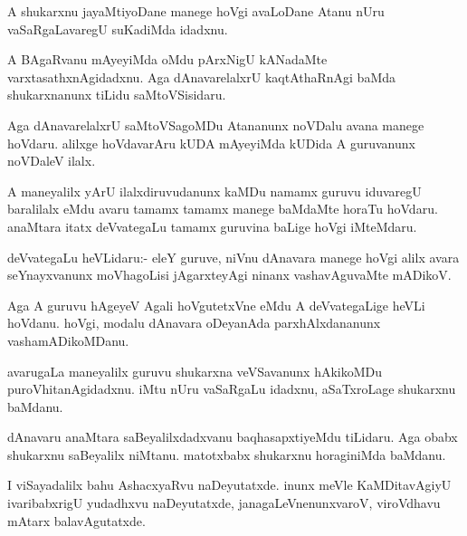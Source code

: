 \documentclass{article}
\begin{document}
\begin{mn}
A shukarxnu jayaMtiyoDane manege hoVgi avaLoDane Atanu nUru
vaSaRgaLavaregU suKadiMda idadxnu.
\end{mn}

\begin{mn}
A BAgaRvanu mAyeyiMda oMdu pArxNigU kANadaMte
varxtasathxnAgidadxnu. Aga dAnavarelalxrU kaqtAthaRnAgi baMda
shukarxnanunx tiLidu saMtoVSisidaru.
\end{mn}

\begin{mn}
Aga dAnavarelalxrU saMtoVSagoMDu Atananunx noVDalu avana manege
hoVdaru. alilxge hoVdavarAru kUDA mAyeyiMda kUDida A guruvanunx
noVDaleV ilalx.
\end{mn}

\begin{mn}
A maneyalilx yArU ilalxdiruvudanunx kaMDu namamx guruvu iduvaregU
baralilalx eMdu avaru tamamx tamamx manege baMdaMte horaTu
hoVdaru. anaMtara itatx deVvategaLu tamamx guruvina baLige hoVgi iMteMdaru.
\end{mn}

\begin{mn}
deVvategaLu heVLidaru:- eleY guruve, niVnu dAnavara manege hoVgi alilx
avara seYnayxvanunx moVhagoLisi jAgarxteyAgi ninanx vashavAguvaMte mADikoV.
\end{mn}

\begin{mn}
Aga A guruvu hAgeyeV Agali hoVgutetxVne eMdu A deVvategaLige heVLi
hoVdanu. hoVgi, modalu dAnavara oDeyanAda parxhAlxdananunx vashamADikoMDanu.
\end{mn}

\begin{mn}%
avarugaLa maneyalilx guruvu shukarxna veVSavanunx hAkikoMDu
puroVhitanAgidadxnu. iMtu nUru vaSaRgaLu idadxnu, aSaTxroLage
shukarxnu baMdanu.
\end{mn}

\begin{mn}
dAnavaru anaMtara saBeyalilxdadxvanu baqhasapxtiyeMdu tiLidaru. Aga
obabx shukarxnu saBeyalilx niMtanu. matotxbabx shukarxnu horaginiMda baMdanu.
\end{mn}

\begin{mn}
I viSayadalilx bahu AshacxyaRvu naDeyutatxde. inunx meVle
KaMDitavAgiyU ivaribabxrigU yudadhxvu naDeyutatxde,
janagaLeVnenunxvaroV, viroVdhavu mAtarx balavAgutatxde.
\end{mn}
\end{document}
